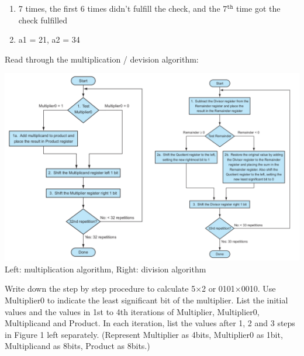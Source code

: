 \documentclass[12pt, a4paper]{article}
\begin{document}
\begin{ans}
    \begin{enumerate}
        \item 7 times, the first 6 times didn't fulfill the check, and the 7$^{\texttt{th}}$ time got the check fulfilled
        \item a1 = 21, a2 = 34 
    \end{enumerate}
\end{ans}
\pagebreak
\begin{q}{20}
Read through the multiplication / devision algorithm: 
\begin{center}
    \includegraphics[scale=0.36]{q2.png}
    Left: multiplication algorithm, Right: division algorithm
\end{center}
Write down the step by step procedure to calculate 5×2 or 0101×0010. Use Multiplier0
to indicate the least significant bit of the multiplier. List the initial values and the values
in 1st to 4th iterations of Multiplier, Multiplier0, Multiplicand and Product. In each
iteration, list the values after 1, 2 and 3 steps in Figure 1 left separately. (Represent
Multiplier as 4bits, Multiplier0 as 1bit, Multiplicand as 8bits, Product as 8bits.)
\end{q}
\end{document}
